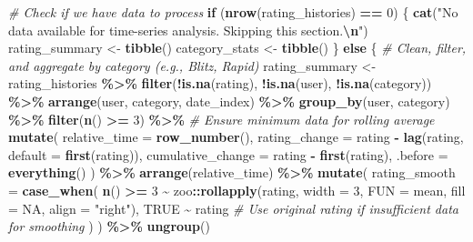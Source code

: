 \documentclass[
]{article}
\newenvironment{Shaded}{\begin{snugshade}}{\end{snugshade}}
\newcommand{\AttributeTok}[1]{\textcolor[rgb]{0.13,0.29,0.53}{#1}}
\newcommand{\CommentTok}[1]{\textcolor[rgb]{0.56,0.35,0.01}{\textit{#1}}}
\newcommand{\ConstantTok}[1]{\textcolor[rgb]{0.56,0.35,0.01}{#1}}
\newcommand{\ControlFlowTok}[1]{\textcolor[rgb]{0.13,0.29,0.53}{\textbf{#1}}}
\newcommand{\DecValTok}[1]{\textcolor[rgb]{0.00,0.00,0.81}{#1}}
\newcommand{\FunctionTok}[1]{\textcolor[rgb]{0.13,0.29,0.53}{\textbf{#1}}}
\newcommand{\NormalTok}[1]{#1}
\newcommand{\OtherTok}[1]{\textcolor[rgb]{0.56,0.35,0.01}{#1}}
\newcommand{\SpecialCharTok}[1]{\textcolor[rgb]{0.81,0.36,0.00}{\textbf{#1}}}
\newcommand{\StringTok}[1]{\textcolor[rgb]{0.31,0.60,0.02}{#1}}
\begin{document}
\begin{Shaded}
\begin{Highlighting}[]
\CommentTok{\# Check if we have data to process}
\ControlFlowTok{if}\NormalTok{ (}\FunctionTok{nrow}\NormalTok{(rating\_histories) }\SpecialCharTok{==} \DecValTok{0}\NormalTok{) \{}
    \FunctionTok{cat}\NormalTok{(}\StringTok{"No data available for time{-}series analysis. Skipping this section.}\SpecialCharTok{\textbackslash{}n}\StringTok{"}\NormalTok{)}
\NormalTok{    rating\_summary }\OtherTok{\textless{}{-}} \FunctionTok{tibble}\NormalTok{()}
\NormalTok{    category\_stats }\OtherTok{\textless{}{-}} \FunctionTok{tibble}\NormalTok{()}
\NormalTok{\} }\ControlFlowTok{else}\NormalTok{ \{}
    \CommentTok{\# Clean, filter, and aggregate by category (e.g., Blitz, Rapid)}
\NormalTok{    rating\_summary }\OtherTok{\textless{}{-}}\NormalTok{ rating\_histories }\SpecialCharTok{\%\textgreater{}\%}
        \FunctionTok{filter}\NormalTok{(}\SpecialCharTok{!}\FunctionTok{is.na}\NormalTok{(rating), }\SpecialCharTok{!}\FunctionTok{is.na}\NormalTok{(user), }\SpecialCharTok{!}\FunctionTok{is.na}\NormalTok{(category)) }\SpecialCharTok{\%\textgreater{}\%}
        \FunctionTok{arrange}\NormalTok{(user, category, date\_index) }\SpecialCharTok{\%\textgreater{}\%}
        \FunctionTok{group\_by}\NormalTok{(user, category) }\SpecialCharTok{\%\textgreater{}\%}
        \FunctionTok{filter}\NormalTok{(}\FunctionTok{n}\NormalTok{() }\SpecialCharTok{\textgreater{}=} \DecValTok{3}\NormalTok{) }\SpecialCharTok{\%\textgreater{}\%} \CommentTok{\# Ensure minimum data for rolling average}
        \FunctionTok{mutate}\NormalTok{(}
            \AttributeTok{relative\_time =} \FunctionTok{row\_number}\NormalTok{(),}
            \AttributeTok{rating\_change =}\NormalTok{ rating }\SpecialCharTok{{-}} \FunctionTok{lag}\NormalTok{(rating, }\AttributeTok{default =} \FunctionTok{first}\NormalTok{(rating)),}
            \AttributeTok{cumulative\_change =}\NormalTok{ rating }\SpecialCharTok{{-}} \FunctionTok{first}\NormalTok{(rating),}
            \AttributeTok{.before =} \FunctionTok{everything}\NormalTok{()}
\NormalTok{        ) }\SpecialCharTok{\%\textgreater{}\%}
        \FunctionTok{arrange}\NormalTok{(relative\_time) }\SpecialCharTok{\%\textgreater{}\%}
        \FunctionTok{mutate}\NormalTok{(}
            \AttributeTok{rating\_smooth =} \FunctionTok{case\_when}\NormalTok{(}
                \FunctionTok{n}\NormalTok{() }\SpecialCharTok{\textgreater{}=} \DecValTok{3} \SpecialCharTok{\textasciitilde{}}\NormalTok{ zoo}\SpecialCharTok{::}\FunctionTok{rollapply}\NormalTok{(rating, }\AttributeTok{width =} \DecValTok{3}\NormalTok{, }\AttributeTok{FUN =}\NormalTok{ mean, }\AttributeTok{fill =} \ConstantTok{NA}\NormalTok{, }\AttributeTok{align =} \StringTok{"right"}\NormalTok{),}
                \ConstantTok{TRUE} \SpecialCharTok{\textasciitilde{}}\NormalTok{ rating }\CommentTok{\# Use original rating if insufficient data for smoothing}
\NormalTok{            )}
\NormalTok{        ) }\SpecialCharTok{\%\textgreater{}\%}
        \FunctionTok{ungroup}\NormalTok{()}


\end{Highlighting}
\end{Shaded}
\end{document}
